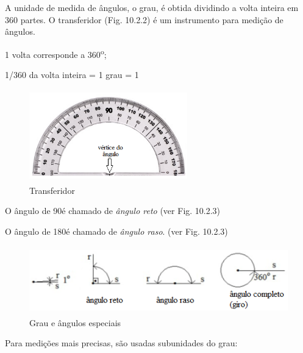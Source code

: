 A unidade de medida de ângulos, o grau, é obtida dividindo a volta inteira em 360 partes. O transferidor (Fig. 10.2.2) é um instrumento para medição de ângulos.                                                     

\begin{multicols}{2}

\begin{caixa}
    1 volta corresponde a 360\textsuperscript{o};
   
    1/360 da volta inteira = 1 grau = 1\degree
\end{caixa}

\begin{figure}[H]
    \begin{Center}
        \includegraphics[width=2.7in,height=1.58in]{capitulos/trigonometria_e_funcoes_trigonometricas/media/image3.png}
    \end{Center}
    \caption{Transferidor}
\end{figure}

\end{multicols}

O ângulo de 90\degree é chamado de \textit{ângulo reto}  (ver Fig. 10.2.3)

O ângulo de 180\degree é chamado de \textit{ângulo raso}. (ver Fig. 10.2.3)

\begin{figure}[H]
    \begin{Center}
        \includegraphics[width=4.92in,height=1.16in]{capitulos/trigonometria_e_funcoes_trigonometricas/media/image4.png}
    \end{Center}
    \caption{Grau e ângulos especiais}
\end{figure}

Para medições mais precisas, são usadas subunidades do grau:

